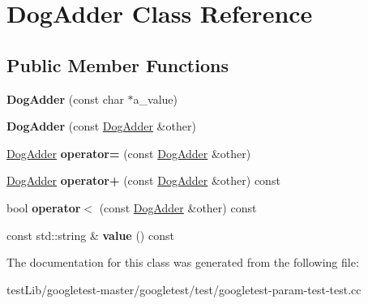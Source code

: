 \hypertarget{classDogAdder}{}\section{Dog\+Adder Class Reference}
\label{classDogAdder}
\subsection*{Public Member Functions}
\begin{DoxyCompactItemize}
\item 
\mbox{\label{classDogAdder_a7fd76a2078834dc255c7dd7ac7c58f32}} 
{\bfseries Dog\+Adder} (const char $\ast$a\+\_\+value)
\item 
\mbox{\label{classDogAdder_a35bb24b649b63f38784dcb44d55c4d94}} 
{\bfseries Dog\+Adder} (const \hyperlink{classDogAdder}{Dog\+Adder} \&other)
\item 
\mbox{\label{classDogAdder_a13bd773069c15b083f876b8afd512247}} 
\hyperlink{classDogAdder}{Dog\+Adder} {\bfseries operator=} (const \hyperlink{classDogAdder}{Dog\+Adder} \&other)
\item 
\mbox{\label{classDogAdder_ad667166cdafb4352396e910faf09a55f}} 
\hyperlink{classDogAdder}{Dog\+Adder} {\bfseries operator+} (const \hyperlink{classDogAdder}{Dog\+Adder} \&other) const
\item 
\mbox{\label{classDogAdder_a6d87d3ee06c0167e7552ba83daa629e7}} 
bool {\bfseries operator$<$} (const \hyperlink{classDogAdder}{Dog\+Adder} \&other) const
\item 
\mbox{\label{classDogAdder_a76bb9e42f79e9d4adacd9e48a3a3c9fb}} 
const std\+::string \& {\bfseries value} () const
\end{DoxyCompactItemize}


The documentation for this class was generated from the following file\+:\begin{DoxyCompactItemize}
\item 
test\+Lib/googletest-\/master/googletest/test/googletest-\/param-\/test-\/test.\+cc\end{DoxyCompactItemize}
